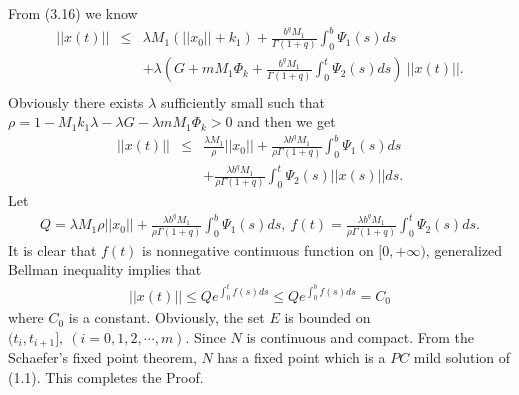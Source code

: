\documentclass[11pt]{article}
\begin{document}
From (3.16) we know
\begin{eqnarray}
||x(t)||&\leq& \lambda M_1\left(||x_0||+k_1\right)+\frac{b^qM_1}{\Gamma(1+q)}\int^b_0\Psi_1(s)ds\nonumber \\
& &+\lambda \left(G+mM_1\Phi_k+\frac{b^qM_1}{\Gamma(1+q)}\int^t_0\Psi_2(s)ds\right) \ ||x(t)||.\nonumber\\
\end{eqnarray}
Obviously there exists $\lambda$ sufficiently small such that $\rho=1-M_1k_1\lambda-\lambda G-\lambda mM_1\Phi_k >0 $ and then we get
\begin{eqnarray*}
||x(t)||&\leq & \frac{\lambda M_1}{\rho}||x_0||+\frac{\lambda b^qM_1}{\rho \Gamma(1+q)}\int^b_0\Psi_1(s)ds\\
& & +\frac{\lambda b^qM_1}{\rho\Gamma (1+q)}\int^t_0\Psi_2(s)||x(s)||ds.
\end{eqnarray*}
Let
\begin{eqnarray*}
Q={\lambda M_1}{\rho}||x_0||+\frac{\lambda b^qM_1}{\rho \Gamma (1+q)}\int^b_0\Psi_1(s)ds, \ f(t)=\frac{\lambda b^q M_1}{\rho \Gamma(1+q)}\int^t_0\Psi_2(s)ds.
\end{eqnarray*}
It is clear that $f(t)$ is nonnegative continuous function on $[0,+\infty)$, generalized Bellman inequality implies that
\begin{eqnarray}
||x(t)||\leq Qe^{\int^t_0f(s)ds} \leq Qe^{\int^b_0f(s)ds}=C_0
\end{eqnarray}
where $C_0$ is a constant. Obviously, the set $E$ is bounded on $(t_i,t_{i+1}], \ (i=0,1,2,\cdots,m)$. Since $N$ is continuous and compact. From the Schaefer's fixed point theorem, $N$ has a fixed point which is a $PC$ mild solution of (1.1). This completes the Proof.
\setcounter{equation}{0}
\end{document}
